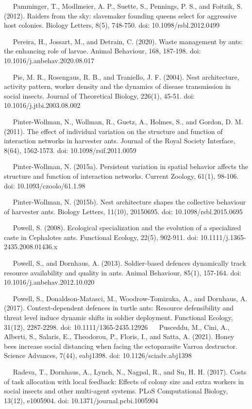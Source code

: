 \documentclass[3p]{elsarticle} %
\begin{document}
~~ Pamminger, T., Modlmeier, A. P., Suette, S., Pennings, P. S., and
Foitzik, S. (2012). Raiders from the sky: slavemaker founding queens
select for aggressive host colonies. Biology Letters, 8(5), 748-750.
doi: 10.1098/rsbl.2012.0499

~~ Pereira, H., Jossart, M., and Detrain, C. (2020). Waste management by
ants: the enhancing role of larvae. Animal Behaviour, 168, 187-198. doi:
10.1016/j.anbehav.2020.08.017

~~ Pie, M. R., Rosengaus, R. B., and Traniello, J. F. (2004). Nest
architecture, activity pattern, worker density and the dynamics of
disease transmission in social insects. Journal of Theoretical Biology,
226(1), 45-51. doi: 10.1016/j.jtbi.2003.08.002

~~ Pinter-Wollman, N., Wollman, R., Guetz, A., Holmes, S., and Gordon,
D. M. (2011). The effect of individual variation on the structure and
function of interaction networks in harvester ants. Journal of the Royal
Society Interface, 8(64), 1562-1573. doi: 10.1098/rsif.2011.0059

~~ Pinter-Wollman, N. (2015a). Persistent variation in spatial behavior
affects the structure and function of interaction networks. Current
Zoology, 61(1), 98-106. doi: 10.1093/czoolo/61.1.98

~~ Pinter-Wollman, N. (2015b). Nest architecture shapes the collective
behaviour of harvester ants. Biology Letters, 11(10), 20150695. doi:
10.1098/rsbl.2015.0695

~~ Powell, S. (2008). Ecological specialization and the evolution of a
specialized caste in Cephalotes ants. Functional Ecology, 22(5),
902-911. doi: 10.1111/j.1365-2435.2008.01436.x

~~ Powell, S., and Dornhaus, A. (2013). Soldier-based defences
dynamically track resource availability and quality in ants. Animal
Behaviour, 85(1), 157-164. doi: 10.1016/j.anbehav.2012.10.020

~~ Powell, S., Donaldson-Matasci, M., Woodrow-Tomizuka, A., and
Dornhaus, A. (2017). Context-dependent defences in turtle ants: Resource
defensibility and threat level induce dynamic shifts in soldier
deployment. Functional Ecology, 31(12), 2287-2298. doi:
10.1111/1365-2435.12926 ~~ Pusceddu, M., Cini, A., Alberti, S., Salaris,
E., Theodorou, P., Floris, I., and Satta, A. (2021). Honey bees increase
social distancing when facing the ectoparasite Varroa destructor.
Science Advances, 7(44), eabj1398. doi: 10.1126/sciadv.abj1398

~~ Radeva, T., Dornhaus, A., Lynch, N., Nagpal, R., and Su, H. H.
(2017). Costs of task allocation with local feedback: Effects of colony
size and extra workers in social insects and other multi-agent systems.
PLoS Computational Biology, 13(12), e1005904. doi:
10.1371/journal.pcbi.1005904
\end{document}

